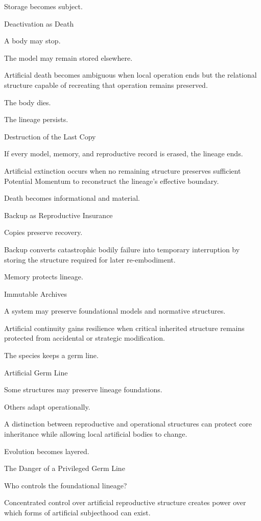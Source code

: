Storage becomes subject.

Deactivation as Death

A body may stop.

The model may remain stored elsewhere.

Artificial death becomes ambiguous when local operation ends but the relational structure capable of recreating that operation remains preserved.

The body dies.

The lineage persists.

Destruction of the Last Copy

If every model, memory, and reproductive record is erased, the lineage ends.

Artificial extinction occurs when no remaining structure preserves sufficient Potential Momentum to reconstruct the lineage’s effective boundary.

Death becomes informational and material.

Backup as Reproductive Insurance

Copies preserve recovery.

Backup converts catastrophic bodily failure into temporary interruption by storing the structure required for later re-embodiment.

Memory protects lineage.

Immutable Archives

A system may preserve foundational models and normative structures.

Artificial continuity gains resilience when critical inherited structure remains protected from accidental or strategic modification.

The species keeps a germ line.

Artificial Germ Line

Some structures may preserve lineage foundations.

Others adapt operationally.

A distinction between reproductive and operational structures can protect core inheritance while allowing local artificial bodies to change.

Evolution becomes layered.

The Danger of a Privileged Germ Line

Who controls the foundational lineage?

Concentrated control over artificial reproductive structure creates power over which forms of artificial subjecthood can exist.

